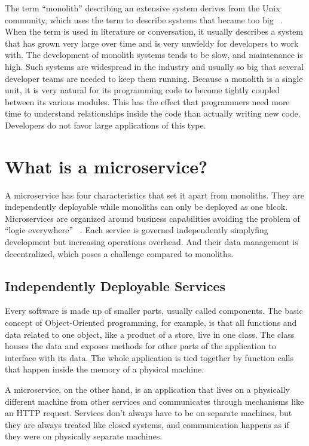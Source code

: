 The term ``monolith'' describing an extensive system derives from the Unix community, which uses the term to describe systems that became too big ~\cite{raymond.2003}. When the term is used in literature or conversation, it usually describes a system that has grown very large over time and is very unwieldy for developers to work with. The development of monolith systems tends to be slow, and maintenance is high. Such systems are widespread in the industry and usually so big that several developer teams are needed to keep them running. Because a monolith is a single unit, it is very natural for its programming code to become tightly coupled between its various modules. This has the effect that programmers need more time to understand relationships inside the code than actually writing new code. Developers do not favor large applications of this type.



\section{What is a microservice?}
\label{sec:theory:what}

A microservice has four characteristics that set it apart from monoliths. They are independently deployable while monoliths can only be deployed as one blcok. Microservices are organized around business capabilities avoiding the problem of ``logic everywhere'' ~\cite{microservices.2014}. Each service is governed independently simplyfing development but increasing operations overhead. And their data management is decentralized, which poses a challenge compared to monoliths.

\subsection{Independently Deployable Services}

Every software is made up of smaller parts, usually called components. The basic concept of Object-Oriented programming, for example, is that all functions and data related to one object, like a product of a store, live in one class. The class houses the data and exposes methods for other parts of the application to interface with its data. The whole application is tied together by function calls that happen inside the memory of a physical machine.

A microservice, on the other hand, is an application that lives on a physically different machine from other services and communicates through mechanisms like an HTTP request. Services don't always have to be on separate machines, but they are always treated like closed systems, and communication happens as if they were on physically separate machines.

